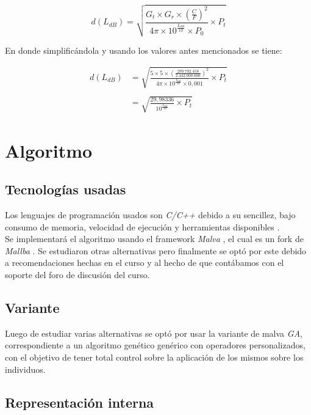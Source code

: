 \documentclass[journal]{IEEEtran}
\begin{document}
$$d(L_{dB}) = \sqrt {\frac {G_t \times G_r \times (\frac {C} {F})^2} {4 \pi \times 10^{\frac {L_{dB}} {10}} \times P_0} \times P_t}$$

En donde simplificándola y usando los valores antes mencionados se tiene:

\begin{equation*}
\begin{split}
d(L_{dB}) &= \sqrt {\frac {5 \times 5 \times (\frac {299.792.458} {2.442.000.000})^2} {4 \pi \times 10^{\frac {L_{dB}} {10}} \times 0,001} \times P_t}\\\\
&= \sqrt {\frac {29,98336} {10^{\frac {L_{dB}} {10}}} \times P_t}
\end{split}
\end{equation*}

\section{Algoritmo}

\subsection{Tecnologías usadas}

Los lenguajes de programación usados son \emph{C/C++} \cite{c:c++:language} debido a su sencillez, bajo consumo de memoria, velocidad de ejecución y herramientas disponibles \cite{why:c:c++}.\\

Se implementará el algoritmo usando el framework \emph{Malva} \cite{malva}, el cual es un fork de \emph{Mallba} \cite{mallba}. Se estudiaron otras alternativas pero finalmente se optó por este debido a recomendaciones hechas en el curso y al hecho de que contábamos con el soporte del foro de discusión del curso.\\

\subsection{Variante}

Luego de estudiar varias alternativas se optó por usar la variante de malva \emph{GA}, correspondiente a un algoritmo genético genérico con operadores personalizados, con el objetivo de tener total control sobre la aplicación de los mismos sobre los individuos.\\

\subsection{Representación interna}
\end{document}
